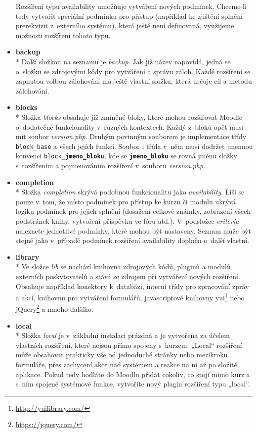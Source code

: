 \documentclass[
print,
  11pt,
  table,   
  nolof,    
  nolot,
  oneside,final
]{fithesis3}
\begin{document}
\begin{itemize}
Rozšíření typu availability umožňuje vytváření nových podmínek. Chceme-li tedy vytvořit speciální podmínku pro přístup (například ke zjištění splnění prerekvizit z~externího systému), která ještě není definovaná, využijeme možnosti rozšíření tohoto typu.

\item \textbf{backup} \\*
Další složkou na seznamu je \emph{backup}. Jak již název napovídá, jedná se o~složku se zdrojovými kódy pro vytváření a správu záloh. Každé rozšíření se zapnutou volbou zálohování má ještě vlastní složku, kte\-rá určuje cíl a metodu zálohování.

\item \textbf{blocks} \\*
Složka \emph{blocks} obsahuje již zmíněné bloky, které mohou rozšiřovat Moodle o~dodatečné funkcionality v~různých kontextech. Každý z~bloků opět musí mít soubor \emph{version.php}. Druhým povinným souborem je implementace třídy \texttt{block{\_}base} a všech jejích funkcí. Soubor i třída v~něm musí dodržet jmennou konvenci \texttt{block{\_}\textbf{jmeno{\_}bloku}}, kde se \texttt{\textbf{jmeno{\_}bloku}} se rovná jménu složky s~rozšířením a pojmenováním rozšíření v~souboru \emph{version.php}.

\item \textbf{completion} \\*
Složka \emph{completion} skrývá podobnou funkcionalitu jako \emph{availability}. Li\-ší se pouze v~tom, že místo podmínek pro přístup ke kurzu či modulu ukrývá logiku podmínek pro jejich splnění (dosažení celkové známky, zobrazení všech podstránek knihy, vytvoření příspěvku ve fóru atd.). V~podsložce \emph{criteria} naleznete jednotlivé podmínky, které mohou být nastaveny. Seznam může být stejně jako v~případě podmínek rozšíření availability doplněn o~další vlastní.

\item \textbf{library} \\*
Ve složce \emph{lib} se nachází knihovna zdrojových kódů, pluginů a modulů externích poskytovatelů a stává se zdrojem při vytváření nových rozšíření. Obsahuje například konektory k~databázi, interní tří\-dy pro zpracování zpráv a akcí, knihovnu pro vytváření formulářů, javascriptové knihovny yui\footnote{\url{http://yuilibrary.com/}} nebo jQuery\footnote{\url{https://jquery.com/}} a mnoho dalšího. 

\item \textbf{local} \\*
Složka \emph{local} je v~základní instalaci prázdná a je vytvořena za účelem vlastních rozšíření, které nejsou přímo spojeny s~kurzem. „Local“ rozšíření může obsahovat prakticky vše od jednoduché stránky nebo mezikroku formuláře, přes zachycení akce nad systémem a reakce na ni až po složité aplikace. Pokud tedy hodláte do Moodlu přidat cokoliv, co stojí mimo kurz a s~ním spojené systémové funkce, vytvoříte nový plugin rozšíření typu „local”.


\end{itemize}
\end{document}
